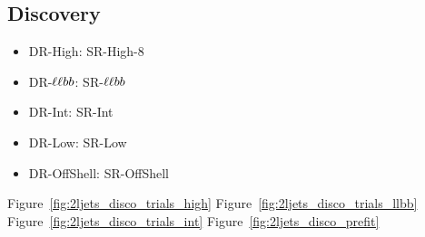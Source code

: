 \FloatBarrier
\subsection{Discovery}
\label{sec:2ljets_disco}

\begin{itemize}
\item DR-High: SR-High-8
\item DR-$\ell\ell bb$: SR-$\ell\ell bb$
\item DR-Int: SR-Int
\item DR-Low: SR-Low
\item DR-OffShell: SR-OffShell
\end{itemize}

Figure~\ref{fig:2ljets_disco_trials_high}
Figure~\ref{fig:2ljets_disco_trials_llbb}
Figure~\ref{fig:2ljets_disco_trials_int}
Figure~\ref{fig:2ljets_disco_prefit}

